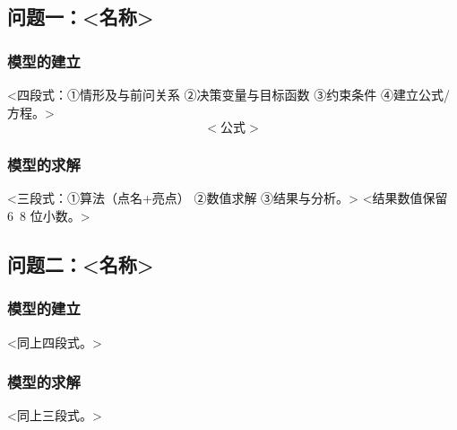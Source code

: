 \documentclass[11pt]{ctexart}
\begin{document}
\subsection{问题一：<名称>}
\subsubsection{模型的建立}
<四段式：①情形及与前问关系 ②决策变量与目标函数 ③约束条件 ④建立公式/方程。>
\begin{equation}
\label{eq:q1}
<公式>
\end{equation}

\subsubsection{模型的求解}
<三段式：①算法（点名+亮点） ②数值求解 ③结果与分析。>
<结果数值保留 6~8 位小数。>

\subsection{问题二：<名称>}
\subsubsection{模型的建立}
<同上四段式。>
\subsubsection{模型的求解}
<同上三段式。>
\end{document}
